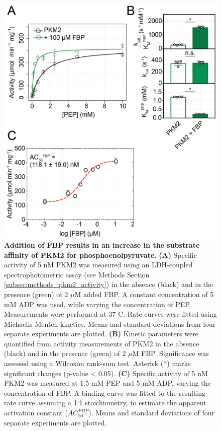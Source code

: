 \begin{figure}[!ht]
\includegraphics[scale=0.7]{ch4_fig3_pkm2activity.png}
\caption[Addition of FBP results in an increase in the substrate affinity of PKM2 for phosphoenolpyruvate.] {\textbf{Addition of FBP results in an increase in the substrate affinity of PKM2 for phosphoenolpyruvate.} \textbf{(A)} Specific activity of 5 nM PKM2 was measured using an LDH-coupled spectrophotometric assay (see Methods Section \ref{subsec:methods_pkm2_activity}) in the absence (black) and in the presence (green) of 2 $\mu$M added FBP. A constant concentration of 5 mM ADP was used, while varying the concentration of PEP. Measurements were performed at 37 \textdegree C. Rate curves were fitted using Michaelis-Menten kinetics. Means and standard deviations from four separate experiments are plotted. \textbf{(B)} Kinetic parameters were quantified from activity measurements of PKM2 in the absence (black) and in the presence (green) of 2 $\mu$M FBP. Significance was assessed using a Wilcoxon rank-sum test. Asterisk (*) marks significant changes (p-value < 0.05). \textbf{(C)} Specific activity of 5 nM PKM2 was measured at 1.5 mM PEP and 5 mM ADP, varying the concentration of FBP. A binding curve was fitted to the resulting rate curve assuming a 1:1 stoichiometry, to estimate the apparent activation constant ($AC_{50}^{FBP}$). Means and standard deviations of four separate experiments are plotted.}
\label{fig:fbp_enzyme_activation}
\end{figure}
%
%
\clearpage



